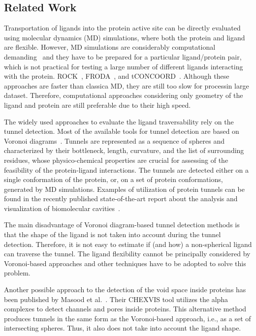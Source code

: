 \documentclass{bmcart}
\begin{document}
\subsection*{Related Work}

Transportation of ligands into the protein active site can be directly evaluated using molecular dynamics (MD) simulations, where both the protein and ligand are flexible.
However, MD simulations are considerably computational demanding~\cite{kingsley2014including} and they have to be prepared
for a particular ligand/protein pair, which is not practical for testing a large number of different ligands interacting with the protein.
ROCK~\cite{lei2004sampling}, FRODA~\cite{wells2005constrained}, and tCONCOORD~\cite{seeliger2007geometry}.
Although these approaches are faster than classica MD, they are still too slow for processin large dataset.
Therefore, computational approaches considering only geometry of the ligand and protein are still preferable due to their high speed.

The widely used approaches to evaluate the ligand traversability rely on the tunnel detection.
Most of the available tools for tunnel detection are based on Voronoi diagrams~\cite{yaffe2008,caver3,sehnal2013mole}.
Tunnels are represented as a sequence of spheres and characterized by their bottleneck, length, curvature, and the list of surrounding residues, whose physico-chemical properties are crucial for assessing of the feasibility of the protein-ligand interactions.
The tunnels are detected either on a single conformation of the protein, or, on a set of protein conformations, generated by MD simulations.
Examples of utilization of protein tunnels can be found in the recently published state-of-the-art report about the analysis and visualization of biomolecular cavities~\cite{Krone_2016}.

The main disadvantage of Voronoi diagram-based tunnel detection methods is that the shape of the ligand is not taken into account during the tunnel detection.
Therefore, it is not easy to estimate if (and how) a non-spherical ligand can traverse the tunnel.
The ligand flexibility cannot be principally considered by Voronoi-based approaches and other techniques have to be adopted to solve this problem.

Another possible approach to the detection of the void space inside proteins has been published by Masood et al.~\cite{masood2015chexvis}.
Their CHEXVIS tool utilizes the alpha complexes to detect channels and pores inside proteins.
This alternative method produces tunnels in the same form as the Voronoi-based approach, i.e., as a set of intersecting spheres.
Thus, it also does not take into account the ligand shape. 
\end{document}
